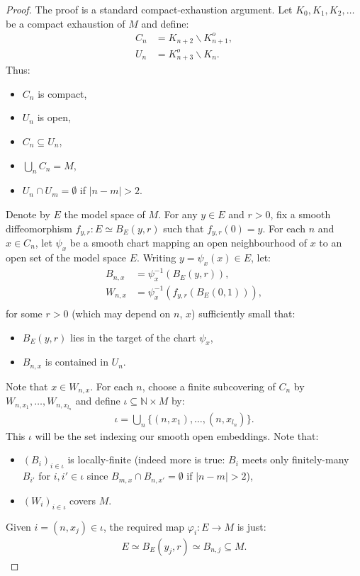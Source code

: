 \begin{proof}
  \leanok
  The proof is a standard compact-exhaustion argument.
  Let $K_0, K_1, K_2, \ldots $ be a compact exhaustion of $M$ and define:
  \begin{align*}
    C_n &= K_{n+2} \smallsetminus K_{n+1}^o,\\
    U_n &= K_{n+3}^o \smallsetminus K_n.
  \end{align*}
  Thus:
  \begin{itemize}
    \item $C_n$ is compact,
    \item $U_n$ is open,
    \item $C_n \subseteq U_n$,
    \item $\bigcup_n C_n = M$,
    \item $U_n \cap U_m = \emptyset$ if $|n - m| > 2$.
  \end{itemize}
  Denote by $E$ the model space of $M$.
  For any $y \in E$ and $r > 0$, fix a smooth diffeomorphism $f_{y,r} : E \simeq B_E(y, r)$ such
  that $f_{y,r}(0) = y$.
  For each $n$ and $x \in C_n$, let $\psi_x$  be a smooth chart mapping an open
  neighbourhood of $x$ to an open set of the model space $E$.
  Writing $y = \psi_x (x) \in E$, let:
  \begin{align*}
    B_{n, x} &= \psi_x^{-1} (B_E(y, r)),\\
    W_{n, x} &= \psi_x^{-1} (f_{y,r} (B_E (0, 1))),\\
  \end{align*}
  for some $r > 0$ (which may depend on $n$, $x$) sufficiently small that:
  \begin{itemize}
    \item $B_E(y, r)$ lies in the target of the chart $\psi_x$,
    \item $B_{n,x}$ is contained in $U_n$.
  \end{itemize}
  Note that $x \in W_{n,x}$. For each $n$, choose a finite subcovering of $C_n$ by
  $W_{n, x_1}, \ldots, W_{n, x_{l_n}}$ and define $\iota \subseteq ℕ \times M$ by:
  \begin{align*}
    \iota = \bigcup_n \{ (n, x_1), \ldots, (n, x_{l_n}) \} .
  \end{align*}
  This $\iota$ will be the set indexing our smooth open embeddings. Note that:
  \begin{itemize}
    \item $(B_i)_{i \in \iota}$ is locally-finite
    (indeed more is true: $B_i$ meets only finitely-many $B_{i'}$ for $i, i' \in \iota$
    since $B_{m, x} \cap B_{n, x'} = \emptyset$ if $|n - m| > 2$),
    \item $(W_i)_{i \in \iota}$ covers $M$.
  \end{itemize}
  Given $i = (n, x_j) \in \iota$, the required map $φ_i : E \to M$ is just:
  \begin{align*}
    E \simeq B_E(y_j, r) \simeq B_{n,j} \subseteq M.
  \end{align*}
\end{proof}

